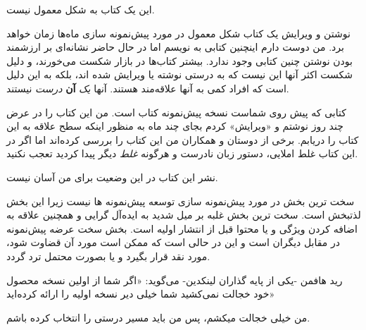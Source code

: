 این یک کتاب به شکل معمول نیست.

نوشتن و ویرایش یک کتاب شکل معمول در مورد پیش‌نمونه سازی ماه‌ها زمان
خواهد برد. من دوست دارم اینچنین کتابی به نویسم اما در حال حاضر نشانه‌ای
بر ارزشمند بودن نوشتن چنین کتابی وجود ندارد. بیشتر کتاب‌ها در بازار شکست
می‌خورند، و دلیل شکست اکثر آنها این نیست که به درستی نوشته یا ویرایش شده
اند، بلکه به این دلیل است که افراد کمی به آنها علاقه‌مند هستند. آنها
\emph{یک} \textbf{آن} \emph{درست} نیستند.

کتابی که پیش روی شماست نسخه پیش‌نمونه کتاب است. من این کتاب را در عرض
چند روز نوشتم و «ویرایش» کردم بجای چند ماه به منظور اینکه سطح علاقه به
این کتاب را دریابم. برخی از دوستان و همکاران من این کتاب را بررسی
کرده‌اند اما اگر در این کتاب غلط املایی، دستور زبان نادرست و هرگونه
\emph{غلط} دیگر پیدا کردید تعجب نکنید.

نشر این کتاب در این وضعیت برای من آسان نیست.

سخت ترین بخش در مورد پیش‌نمونه سازی توسعه پیش‌نمونه ها نیست زیرا این بخش
لذتبخش است. سخت ترین بخش غلبه بر میل شدید به ایده‌آل گرایی و همچنین
علاقه به اضافه کردن ویژگی و یا محتوا قبل از انتشار اولیه است. بخش سخت
عرضه پیش‌نمونه در مقابل دیگران است و این در حالی است که ممکن است مورد آن
قضاوت شود، مورد نقد قرار بگیرد و یا بصورت محتمل ترد گردد.

رید هافمن -یکی از پایه گذاران لینکدین- می‌گوید: «اگر شما از اولین نسخه
محصول خود خجالت نمی‌کشید شما خیلی دیر نسخه اولیه را ارائه کرده‌اید»

من خیلی خجالت میکشم، پس من باید مسیر درستی را انتخاب کرده باشم.
